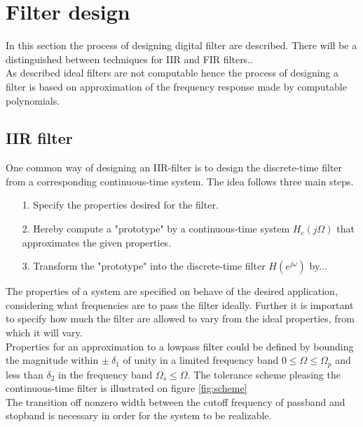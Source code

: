 \section{Filter design}
In this section the process of designing digital filter are described. There will be a distinguished between techniques for IIR and FIR filters..\\
As described ideal filters are not computable hence the process of designing a filter is based on approximation of the frequency response made by computable polynomials.  


\subsection{IIR filter}
One common way of designing an IIR-filter is to design the discrete-time filter from a corresponding continuous-time system. The idea follows three main steps. 
\begin{itemize}
\item[1.] Specify the properties desired for the filter.
\item[2.] Hereby compute a "prototype" by a continuous-time system $H_c(j\Omega)$ that approximates the given properties.
\item[3.] Transform the "prototype" into the discrete-time filter $H(e^{j\omega})$ by... 
\end{itemize}
The properties of a system are specified on behave of the desired application, considering what frequencies are to pass the filter ideally. Further it is important to specify how much the filter are allowed to vary from the ideal properties, from which it will vary. \\
Properties for an approximation to a lowpass filter could be defined by bounding the magnitude within $\pm \ \delta_1$ of unity in a limited frequency band $0 \leq \Omega \leq \Omega_p $ and less than $\delta_2$ in the frequency band $\Omega_s \leq \Omega$. 
The tolerance scheme pleasing the continuous-time filter is illustrated on figure \ref{fig:scheme}\\ 
The transition off nonzero width between the cutoff frequency of passband and stopband is necessary in order for the system to be realizable.

